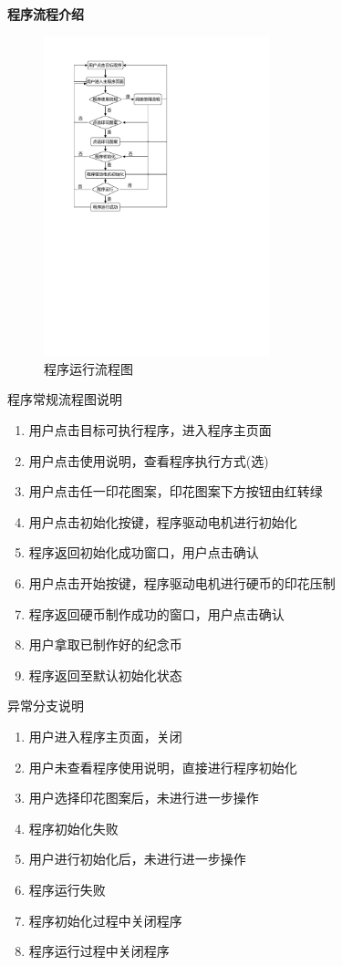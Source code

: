 \documentclass[UTF8,14pt]{article}
\newcommand\sectionone[1]{\centerline{\Large{\bfseries{#1}}}}
\begin{document}
\vspace{0.5cm}
\sectionone{程序流程介绍}
\begin{figure}%
	\vspace{-0.4cm}
	\centering
	\includegraphics[width=6.56cm]{figures/流程图.pdf}
	\vspace{-10pt}
	\caption{程序运行流程图}
	\vspace{-15pt}
\end{figure}
程序常规流程图说明
\begin{enumerate}
	\item 用户点击目标可执行程序，进入程序主页面
	\item 用户点击使用说明，查看程序执行方式(选)
	\item 用户点击任一印花图案，印花图案下方按钮由红转绿
	\item 用户点击初始化按键，程序驱动电机进行初始化
	\item 程序返回初始化成功窗口，用户点击确认
	\item 用户点击开始按键，程序驱动电机进行硬币的印花压制
	\item 程序返回硬币制作成功的窗口，用户点击确认
	\item 用户拿取已制作好的纪念币
	\item 程序返回至默认初始化状态
\end{enumerate}

异常分支说明
\begin{enumerate}
	\item 用户进入程序主页面，关闭
	\item 用户未查看程序使用说明，直接进行程序初始化
	\item 用户选择印花图案后，未进行进一步操作
	\item 程序初始化失败
	\item 用户进行初始化后，未进行进一步操作
	\item 程序运行失败
	\item 程序初始化过程中关闭程序
	\item 程序运行过程中关闭程序
\end{enumerate}
\end{document}
